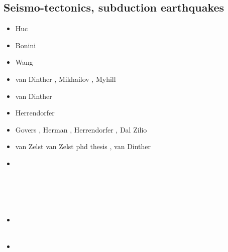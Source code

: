 \subsection{Seismo-tectonics, subduction earthquakes}

\begin{scriptsize}
\begin{itemize}
\item[\nineteenninetyeight] Huc \etal \cite{huhc98}
\item[\twothousandthree] Bonini \etal \cite{bocs03}
\item[\twothousandtwelve] Wang \etal \cite{wahh12}
\item[\twothousandthirteen] van Dinther \etal \cite{vagd13a,vagd13b}, Mikhailov \cite{milp13},
                            Myhill \cite{myhi13}
\item[\twothousandfourteen] van Dinther \etal \cite{vamd14}
\item[\twothousandfifteen] Herrendorfer \etal \cite{hevg15}
\item[\twothousandeighteen] Govers \etal \cite{gofv18}, Herman \etal \cite{hefg18}, 
                            Herrendorfer \etal \cite{hegv18}, Dal Zilio \etal \cite{davg18}
\item[\twothousandnineteen] van Zelst \etal \cite{vawg19} van Zelst phd thesis \cite{vanzelst},
                            van Dinther \etal \cite{vakf19}
\item[\twothousandtwenty] 
\textcite{brvf20} \\
\textcite{pegy20} \\
\textcite{dadm20} \\
\textcite{mabb20} \\
\textcite{hego20} \\
\item[\twothousandtwentyone] 
\textcite{jamp21} \\
\textcite{begc21} \\
\item[\twothousandtwentytwo] 
\textcite{toyp22} 
\textcite{dage22} 
\textcite{dala22} 
\end{itemize}
\end{scriptsize}

